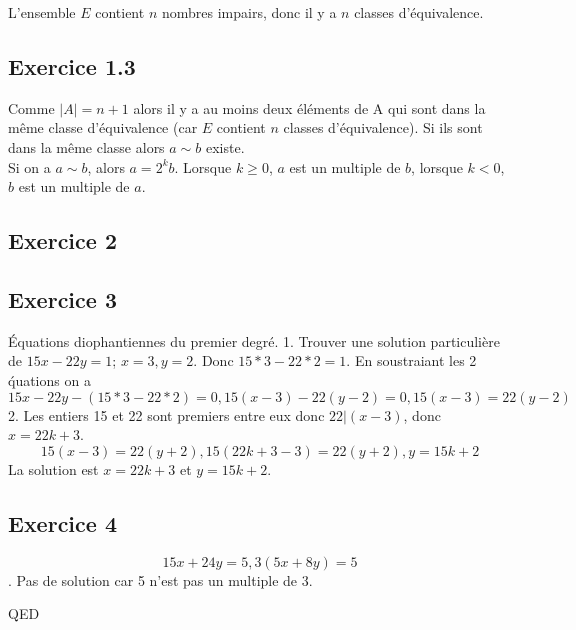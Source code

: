 \documentclass[]{book}
\theoremstyle{definition}
\begin{document}
L'ensemble $E$ contient $n$ nombres impairs, donc il y a $n$ classes d'\'equivalence.

\subsection*{Exercice 1.3}
Comme $|A| = n+1$ alors il y a au moins deux \'el\'ements de A qui sont dans la m\^eme classe d'\'equivalence (car $E$ contient $n$ classes d'\'equivalence). Si ils sont dans la m\^eme classe alors $a \sim b$ existe.\\

Si on a $a \sim b$, alors $a=2^kb$. Lorsque $k\geq 0$, $a$ est un multiple de $b$, lorsque $k<0$, $b$ est un multiple de $a$.

\subsection*{Exercice 2}

\subsection*{Exercice 3}
\'Equations diophantiennes du premier degr\'e.
1. Trouver une solution particuli\`ere de $15x - 22y = 1$; $x=3, y=2$. Donc $15*3-22*2 = 1$. En soustraiant les 2 \'quations on a 
$$15x - 22y - (15*3-22*2) = 0, 15(x-3) - 22(y-2) = 0, 15(x-3) = 22(y-2)$$
2. Les entiers 15 et 22 sont premiers entre eux donc $22|(x-3)$, donc $x= 22k+3$.
$$15(x-3) = 22(y+2), 15(22k+3-3) = 22(y+2), y = 15k+2$$
La solution est $x=22k+3$ et $y=15k+2$.

\subsection*{Exercice 4}
$$15x+24y = 5, 3(5x+8y) = 5$$.
Pas de solution car 5 n'est pas un multiple de 3.


QED
\end{document}
